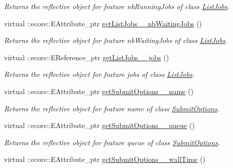 \begin{DoxyCompactItemize}
\begin{DoxyCompactList}\small\item\em Returns the reflective object for feature nbRunningJobs of class \hyperlink{classTMS__Data_1_1ListJobs}{ListJobs}. \item\end{DoxyCompactList}\item 
virtual ::ecore::EAttribute\_\-ptr \hyperlink{classTMS__Data_1_1TMS__DataPackage_a3dbd47d06f09a372f248fd47bf208eac}{getListJobs\_\-\_\-nbWaitingJobs} ()
\begin{DoxyCompactList}\small\item\em Returns the reflective object for feature nbWaitingJobs of class \hyperlink{classTMS__Data_1_1ListJobs}{ListJobs}. \item\end{DoxyCompactList}\item 
virtual ::ecore::EReference\_\-ptr \hyperlink{classTMS__Data_1_1TMS__DataPackage_ad07ff0d26a3a8b55eb59fc8d1ee57dac}{getListJobs\_\-\_\-jobs} ()
\begin{DoxyCompactList}\small\item\em Returns the reflective object for feature jobs of class \hyperlink{classTMS__Data_1_1ListJobs}{ListJobs}. \item\end{DoxyCompactList}\item 
virtual ::ecore::EAttribute\_\-ptr \hyperlink{classTMS__Data_1_1TMS__DataPackage_a810824e22ed550568241d2d320f71020}{getSubmitOptions\_\-\_\-name} ()
\begin{DoxyCompactList}\small\item\em Returns the reflective object for feature name of class \hyperlink{classTMS__Data_1_1SubmitOptions}{SubmitOptions}. \item\end{DoxyCompactList}\item 
virtual ::ecore::EAttribute\_\-ptr \hyperlink{classTMS__Data_1_1TMS__DataPackage_a4ae28da7b7d2866294accf02196b4a64}{getSubmitOptions\_\-\_\-queue} ()
\begin{DoxyCompactList}\small\item\em Returns the reflective object for feature queue of class \hyperlink{classTMS__Data_1_1SubmitOptions}{SubmitOptions}. \item\end{DoxyCompactList}\item 
virtual ::ecore::EAttribute\_\-ptr \hyperlink{classTMS__Data_1_1TMS__DataPackage_a6f4705c94f945907f95191d4b893fc7b}{getSubmitOptions\_\-\_\-wallTime} ()

\end{DoxyCompactItemize}
